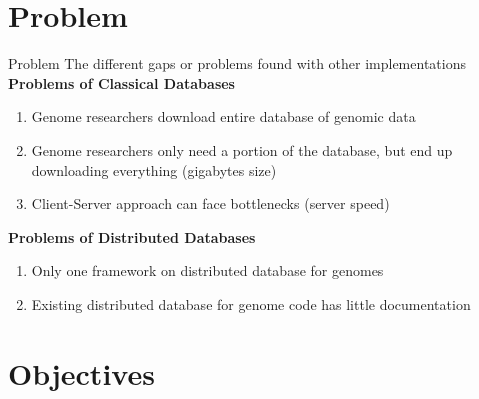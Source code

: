 \documentclass{beamer}
\begin{document}
\section{Problem}
\begin{frame}{Problem}
The different gaps or problems found with other implementations
\textbf{Problems of Classical Databases}
\begin{enumerate}
    \item Genome researchers download entire database of genomic data
    \item Genome researchers only need a portion of the database, but end up downloading everything  (gigabytes size)
    \item Client-Server approach can face bottlenecks (server speed) %
    \end{enumerate}


\textbf{Problems of Distributed Databases}

\begin{enumerate}
    \item Only one framework on distributed database for genomes
    \item Existing distributed database for genome code has little documentation %

\end{enumerate}
\end{frame}

\begin{frame}
\titlepage %
\end{frame}



\section{Objectives}
\end{document}

